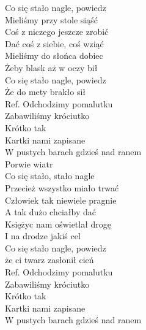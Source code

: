 
\begin{flushleft}
Co się stało nagle, powiedz \\
Mieliśmy przy stole siąść \\
Coś z niczego jeszcze zrobić \\
Dać coś z siebie, coś wziąć \\
Mieliśmy do słońca dobiec \\
Żeby blask aż w oczy bił \\
Co się stało nagle, powiedz \\
Że do mety brakło sił \\
\vskip 3mm
Ref. Odchodzimy pomalutku \tab{}\\
\hspace{0.9cm}Zabawiliśmy króciutko \tab{} \\
\hspace{0.9cm}Krótko tak \tab{}\\
\hspace{0.9cm}Kartki nami zapisane \tab{}\\
\hspace{0.9cm}W pustych barach gdzieś nad ranem \\
\hspace{0.9cm}Porwie wiatr \tab{}\\
\vskip 3mm
Co się stało, stało nagle \\
Przecież wszystko miało trwać \\
Człowiek tak niewiele pragnie \\
A tak dużo chciałby dać \\
Księżyc nam oświetlał drogę \\
I na drodze jakiś cel \\
Co się stało nagle, powiedz \\
że ci twarz zasłonił cień \\
\vskip 3mm
Ref. Odchodzimy pomalutku\\
\hspace{0.9cm}Zabawiliśmy króciutko  \\
\hspace{0.9cm}Krótko tak \\
\hspace{0.9cm}Kartki nami zapisane \\
\hspace{0.9cm}W pustych barach gdzieś nad ranem \\

\end{flushleft}
